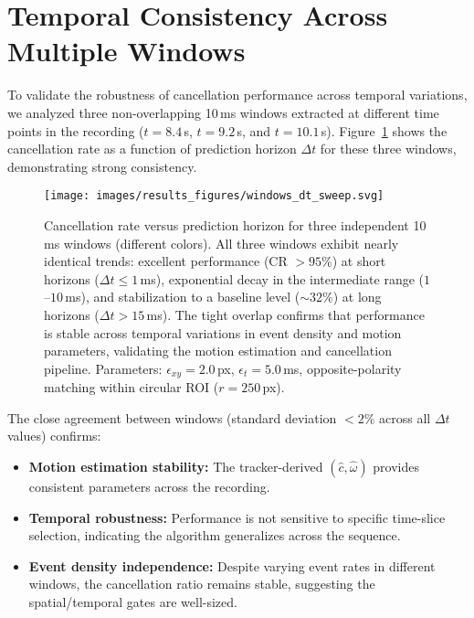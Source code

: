 

\section{Temporal Consistency Across Multiple Windows}

To validate the robustness of cancellation performance across temporal variations, we analyzed three non-overlapping 10\,ms windows extracted at different time points in the recording ($t=8.4$\,s, $t=9.2$\,s, and $t=10.1$\,s). Figure~\ref{fig:windows_dt_sweep} shows the cancellation rate as a function of prediction horizon $\Delta t$ for these three windows, demonstrating strong consistency.

\begin{figure}[t]
  \centering
  \texttt{[image: images/results\_figures/windows\_dt\_sweep.svg]}
  \caption{Cancellation rate versus prediction horizon for three independent 10\,ms windows (different colors). All three windows exhibit nearly identical trends: excellent performance (CR $>95\%$) at short horizons ($\Delta t \leq 1$\,ms), exponential decay in the intermediate range ($1$--$10$\,ms), and stabilization to a baseline level ($\sim 32\%$) at long horizons ($\Delta t > 15$\,ms). The tight overlap confirms that performance is stable across temporal variations in event density and motion parameters, validating the motion estimation and cancellation pipeline. Parameters: $\epsilon_{xy}=2.0$\,px, $\epsilon_t=5.0$\,ms, opposite-polarity matching within circular ROI ($r=250$\,px).}
  \label{fig:windows_dt_sweep}
\end{figure}

The close agreement between windows (standard deviation $< 2\%$ across all $\Delta t$ values) confirms:
\begin{itemize}
  \item \textbf{Motion estimation stability:} The tracker-derived $(\hat c,\hat\omega)$ provides consistent parameters across the recording.
  \item \textbf{Temporal robustness:} Performance is not sensitive to specific time-slice selection, indicating the algorithm generalizes across the sequence.
  \item \textbf{Event density independence:} Despite varying event rates in different windows, the cancellation ratio remains stable, suggesting the spatial/temporal gates are well-sized.
\end{itemize}

